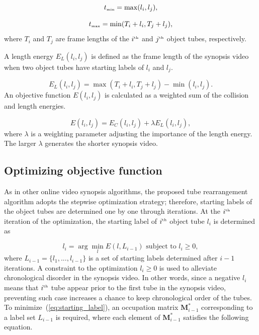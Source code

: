 \documentclass[11pt]{hyu_thesis}
\begin{document}
\begin{equation}
\label{eq:t_min}
t_\textrm{\tiny{min}} = \max(l_i, l_j),
\end{equation}

\begin{equation}
\label{eq:t_max}
t_\textrm{\tiny{max}} = \min(T_i + l_i, T_j + l_j),
\end{equation}
where $T_i$ and $T_j$ are frame lengths of the $i^\textrm{\tiny{th}}$ and $j^\textrm{\tiny{th}}$ object tubes, respectively.

A length energy $E_L (l_i,l_j)$ is defined as the frame length of the synopsis video when two object tubes have starting labels of $l_i$ and $l_j$.

\begin{equation}
\label{eq:length_cost}
E_L(l_i, l_j) = \max(T_i + l_i, T_j + l_j) - \min(l_i, l_j).
\end{equation}
An objective function $E(l_i,l_j)$ is calculated as a weighted sum of the collision and length energies.

\begin{equation}
\label{eq:obj_func}
E(l_i, l_j) = E_C(l_i, l_j) + \lambda E_L(l_i, l_j),
\end{equation}
where $\lambda$ is a weighting parameter adjusting the importance of the length energy. The larger $\lambda$ generates the shorter synopsis video.

\subsection{Optimizing objective function}
As in other online video synopsis algorithms, the proposed tube rearrangement algorithm adopts the stepwise optimization strategy; therefore, starting labels of the object tubes are determined one by one through iterations. At the $i^\textrm{\tiny{th}}$ iteration of the optimization, the starting label of $i^\textrm{\tiny{th}}$ object tube $l_i$ is determined as

\begin{equation}
\label{eq:starting_label}
l_i = \arg\min_l E(l, L_{i-1}) \textrm{ subject to } l_i \geq 0,
\end{equation}
where $L_{i-1} = \{ {l}_{1},...,{l}_{i-1} \}$ is a set of starting labels determined after $i-1$ iterations. A constraint to the optimization ${l}_{i} \geq 0$ is used to alleviate chronological disorder in the synopsis video. In other words, since a negative $l_i$ means that ${i}^\textrm{\tiny{th}}$ tube appear prior to the first tube in the synopsis video, preventing such case increases a chance to keep chronological order of the tubes. To minimize~(\ref{eq:starting_label}), an occupation matrix $\textbf{M}_{i-1}^{*}$ corresponding to a label set $L_{i-1}$ is required, where each element of $\textbf{M}_{i-1}^{*}$  satisfies the following equation.
\end{document}
